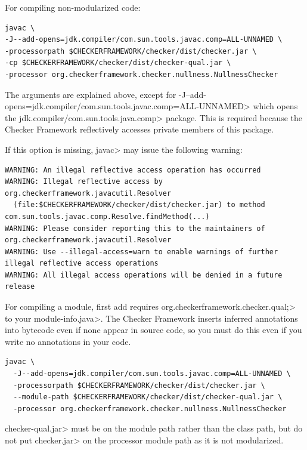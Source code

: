 For compiling non-modularized code:
\begin{Verbatim}
javac \
-J--add-opens=jdk.compiler/com.sun.tools.javac.comp=ALL-UNNAMED \
-processorpath $CHECKERFRAMEWORK/checker/dist/checker.jar \
-cp $CHECKERFRAMEWORK/checker/dist/checker-qual.jar \
-processor org.checkerframework.checker.nullness.NullnessChecker
\end{Verbatim}

The arguments are explained above, except for
\<-J--add-opens=jdk.compiler/com.sun.tools.javac.comp=ALL-UNNAMED> which
opens the \<jdk.compiler/com.sun.tools.java.comp> package.  This is
required because the Checker Framework reflectively accesses private members of this package.

If this option is missing, \<javac> may issue the following warning:
\begin{Verbatim}
WARNING: An illegal reflective access operation has occurred
WARNING: Illegal reflective access by org.checkerframework.javacutil.Resolver
  (file:$CHECKERFRAMEWORK/checker/dist/checker.jar) to method com.sun.tools.javac.comp.Resolve.findMethod(...)
WARNING: Please consider reporting this to the maintainers of org.checkerframework.javacutil.Resolver
WARNING: Use --illegal-access=warn to enable warnings of further illegal reflective access operations
WARNING: All illegal access operations will be denied in a future release
\end{Verbatim}

For compiling a module, first add \<requires
org.checkerframework.checker.qual;> to your \<module-info.java>.  The Checker
Framework inserts inferred annotations into bytecode even if none appear in source code,
so you must do this even if you write no annotations in your code.

\begin{Verbatim}
javac \
  -J--add-opens=jdk.compiler/com.sun.tools.javac.comp=ALL-UNNAMED \
  -processorpath $CHECKERFRAMEWORK/checker/dist/checker.jar \
  --module-path $CHECKERFRAMEWORK/checker/dist/checker-qual.jar \
  -processor org.checkerframework.checker.nullness.NullnessChecker
\end{Verbatim}

\<checker-qual.jar> must be on the module path rather than the class path, but
do not put \<checker.jar> on the processor module path as it is not
modularized.


\sectionAndLabel{Eclipse}{eclipse}



